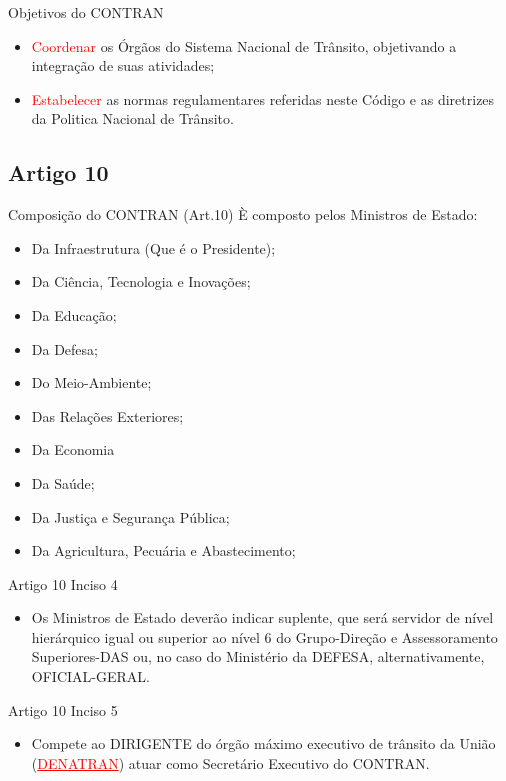 \documentclass{beamer}
\begin{document}
\begin{frame}{Objetivos do CONTRAN}
    \begin{itemize}
        \item \justifying \textcolor{red}{Coordenar} os Órgãos do Sistema Nacional de Trânsito, objetivando a integração de suas atividades; 
        \item \justifying \textcolor{red}{Estabelecer} as normas regulamentares referidas neste Código e as diretrizes da Politica Nacional de Trânsito.
    \end{itemize}
\end{frame}


\subsection{Artigo 10}
\begin{frame}{Composição do CONTRAN (Art.10)}
È composto pelos Ministros de Estado:
    \begin{itemize}
        \item Da Infraestrutura (Que é o Presidente);
        \item Da Ciência, Tecnologia e Inovações;
        \item Da Educação;
        \item Da Defesa;
        \item Do Meio-Ambiente; 
        \item Das Relações Exteriores;
        \item Da Economia
        \item Da Saúde;
        \item Da Justiça e Segurança Pública;
        \item Da Agricultura, Pecuária e Abastecimento; 
    \end{itemize}
\end{frame}
\begin{frame}{Artigo 10 Inciso 4}
    \begin{itemize}
        \item \justifying Os Ministros de Estado deverão indicar suplente, que será servidor de nível hierárquico igual ou superior ao nível 6 do Grupo-Direção e Assessoramento Superiores-DAS ou, no caso do Ministério da DEFESA, alternativamente, OFICIAL-GERAL.
    \end{itemize}
\end{frame}
\begin{frame}{Artigo 10 Inciso 5}
    \begin{itemize}
        \item \justifying Compete ao DIRIGENTE do órgão máximo executivo de trânsito da União (\textcolor{red}{\underline{DENATRAN}}) atuar como Secretário Executivo do CONTRAN.
    \end{itemize}
\end{frame}
\end{document}

